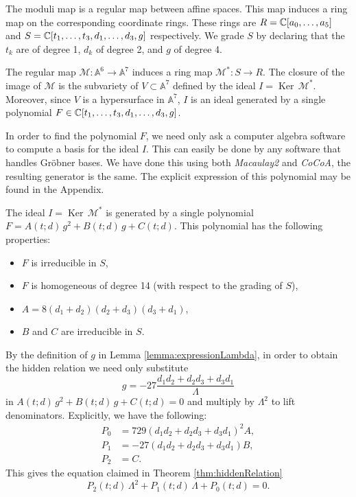 \documentclass[phd,tocprelim]{cornell}
\begin{document}
The moduli map is a regular map between affine spaces. This map induces a ring map on the corresponding coordinate rings. These rings are $R=\mathbb{C}[a_0,\ldots,a_5]$ and $S=\mathbb{C}[t_1,\ldots,t_3,d_1,\ldots,d_3,g]$ respectively. We grade $S$ by declaring that the $t_k$ are of degree 1, $d_k$ of degree 2, and $g$ of degree 4. 

\begin{remark}
 The regular map $\mathcal{M}\colon\mathbb{A}^6\to\mathbb{A}^7$ induces a ring map $\mathcal{M}^*\colon S\to R$. The closure of the image of $\mathcal{M}$ is the subvariety of $V\subset\mathbb{A}^7$ defined by the ideal $I=\operatorname{Ker}\,\mathcal{M}^*$. Moreover, since $V$ is a hypersurface in $\mathbb{A}^7$, $I$ is an ideal generated by a single polynomial $F\in \mathbb{C}[t_1,\ldots,t_3,d_1,\ldots,d_3,g]$.
\end{remark}

In order to find the polynomial $F$, we need only ask a computer algebra software to compute a basis for the ideal $I$. This can easily be done by any software that handles Gr\"{o}bner bases. We have done this using both \textit{Macaulay2} and \textit{CoCoA}, the resulting generator is the same. The explicit expression of this polynomial may be found in the Appendix. %

\begin{proposition}\label{prop:descriptionF}
 The ideal $I=\operatorname{Ker}\,\mathcal{M}^*$ is generated by a single polynomial $F=A(t;d)\,g^2+B(t;d)\,g+C(t;d)$. This polynomial has the following properties:
 \begin{itemize}[topsep=-2pt,itemsep=-4pt]
  \item $F$ is irreducible in $S$,
  \item $F$ is homogeneous of degree 14 (with respect to the grading of $S$),
  \item $A=8(d_1+d_2)(d_2+d_3)(d_3+d_1)$,
  \item $B$ and $C$ are irreducible in $S$.
 \end{itemize}
\end{proposition}

By the definition of $g$ in Lemma \ref{lemma:expressionLambda}, in order to obtain the hidden relation we need only substitute
 \[ g=-27\frac{d_1d_2+d_2d_3+d_3d_1}{\Lambda} \]
in $A(t;d)\,g^2+B(t;d)\,g+C(t;d)=0$ and multiply by $\Lambda^2$ to lift denominators. Explicitly, we have the following:
\begin{align*} 
 P_0 &= 729(d_1d_2+d_2d_3+d_3d_1)^2A , \\
 P_1 &= -27(d_1d_2+d_2d_3+d_3d_1)B, \\
 P_2 &= C .
\end{align*}
This gives the equation claimed in Theorem \ref{thm:hiddenRelation}
 \begin{equation}\label{eq:hiddenRelationBis}
  P_2(t;d)\,\Lambda^2+P_1(t;d)\,\Lambda+P_0(t;d)=0.
 \end{equation}
\end{document}
